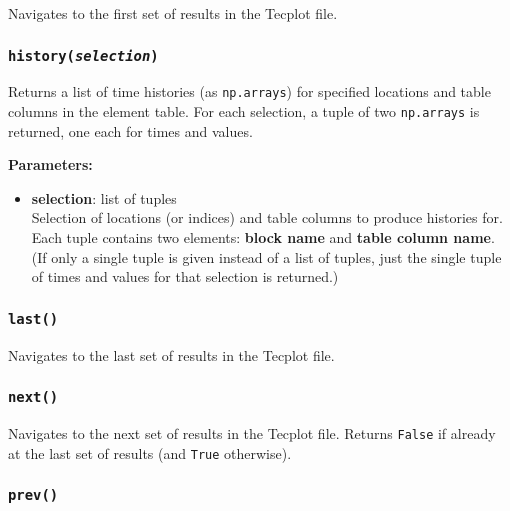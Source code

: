 Navigates to the first set of results in the Tecplot file.

\begin{snugshade}
\subsubsection{\texttt{history(\emph{selection})}}
\end{snugshade}
\label{sec:toughreact_tecplot:history}

Returns a list of time histories (as \texttt{np.arrays}) for specified locations and table columns in the element table.  For each selection, a tuple of two \texttt{np.arrays} is returned, one each for times and values.

\textbf{Parameters:}
\begin{itemize}
\item \textbf{selection}: list of tuples\\
  Selection of locations (or indices) and table columns to produce histories for.  Each tuple contains two elements: \textbf{block name} and \textbf{table column name}.  (If only a single tuple is given instead of a list of tuples, just the single tuple of times and values for that selection is returned.)
\end{itemize}

\begin{snugshade}
\subsubsection{\texttt{last()}}
\end{snugshade}
\label{sec:toughreact_tecplot:last}

Navigates to the last set of results in the Tecplot file.

\begin{snugshade}
\subsubsection{\texttt{next()}}
\end{snugshade}
\label{sec:toughreact_tecplot:next}

Navigates to the next set of results in the Tecplot file.  Returns \texttt{False} if already at the last set of results (and \texttt{True} otherwise).

\begin{snugshade}
\subsubsection{\texttt{prev()}}
\end{snugshade}
\label{sec:toughreact_tecplot:prev}

